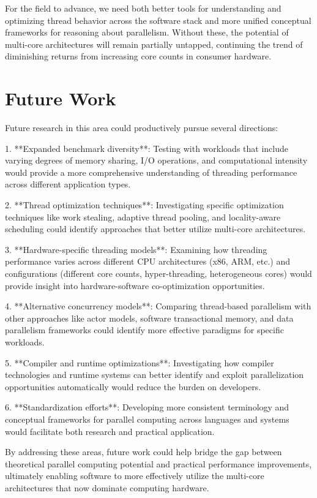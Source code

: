 \documentclass[12pt,a4paper]{article}
\begin{document}
For the field to advance, we need both better tools for understanding and optimizing thread behavior across the software stack and more unified conceptual frameworks for reasoning about parallelism. Without these, the potential of multi-core architectures will remain partially untapped, continuing the trend of diminishing returns from increasing core counts in consumer hardware.

\section{Future Work}

Future research in this area could productively pursue several directions:

1. **Expanded benchmark diversity**: Testing with workloads that include varying degrees of memory sharing, I/O operations, and computational intensity would provide a more comprehensive understanding of threading performance across different application types.

2. **Thread optimization techniques**: Investigating specific optimization techniques like work stealing, adaptive thread pooling, and locality-aware scheduling could identify approaches that better utilize multi-core architectures.

3. **Hardware-specific threading models**: Examining how threading performance varies across different CPU architectures (x86, ARM, etc.) and configurations (different core counts, hyper-threading, heterogeneous cores) would provide insight into hardware-software co-optimization opportunities.

4. **Alternative concurrency models**: Comparing thread-based parallelism with other approaches like actor models, software transactional memory, and data parallelism frameworks could identify more effective paradigms for specific workloads.

5. **Compiler and runtime optimizations**: Investigating how compiler technologies and runtime systems can better identify and exploit parallelization opportunities automatically would reduce the burden on developers.

6. **Standardization efforts**: Developing more consistent terminology and conceptual frameworks for parallel computing across languages and systems would facilitate both research and practical application.

By addressing these areas, future work could help bridge the gap between theoretical parallel computing potential and practical performance improvements, ultimately enabling software to more effectively utilize the multi-core architectures that now dominate computing hardware.
\end{document}
